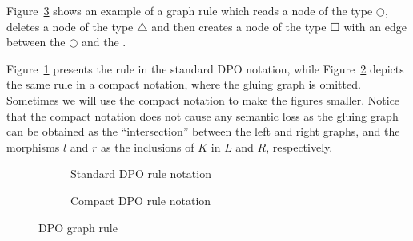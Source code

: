 \begin{example} Figure~\ref{fig:gts:rule} shows an example of a graph rule which reads a node of the type $\Circle$, deletes a node of the type $\triangle$ and then creates a node of the type $\Square$ with an edge between the $\Circle$ and the \Square. 
  
Figure~\ref{fig:gts:rule-standard} presents the rule in the standard DPO notation, while Figure~\ref{fig:gts:rule-compact} depicts the same rule in a compact notation, where the gluing graph is omitted. Sometimes we will use the compact notation to make the figures smaller. Notice that the compact notation does not cause any semantic loss as the gluing graph can be obtained as the ``intersection'' between the left and right graphs, and the morphisms $l$ and $r$ as the inclusions of $K$ in $L$ and $R$, respectively.

\begin{figure}[!ht]
  \centering
  \begin{subfigure}[t]{.5\textwidth}
    \centerline{}
    \caption{Standard DPO rule notation}\label{fig:gts:rule-standard}
  \end{subfigure}

  \begin{subfigure}[t]{.5\textwidth}
    \centerline{}
    \caption{Compact DPO rule notation}\label{fig:gts:rule-compact}
  \end{subfigure}
  \caption{DPO graph rule}\label{fig:gts:rule}
\end{figure}
\end{example}

